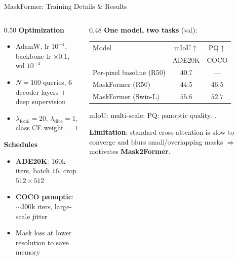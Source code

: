 \begin{frame}{MaskFormer: Training Details \& Results}

  \begin{columns}[t]
    \begin{column}{0.50\textwidth}
      \textbf{Optimization}
      \begin{itemize}
        \item AdamW, lr $10^{-4}$, backbone lr $\times 0.1$, wd $10^{-4}$
        \item $N = 100$ queries, $6$ decoder layers $+$ deep supervision
        \item $\lambda_\text{focal} = 20$, $\lambda_\text{dice} = 1$, class CE weight $= 1$
      \end{itemize}

      \vspace{0.3em}
      \textbf{Schedules}
      \begin{itemize}
        \item \textbf{ADE20K}: $160$k iters, batch $16$, crop $512{\times}512$
        \item \textbf{COCO panoptic}: $\sim$$300$k iters, large-scale jitter
        \item Mask loss at lower resolution to save memory
      \end{itemize}
    \end{column}
    \begin{column}{0.48\textwidth}
      \textbf{One model, two tasks} (val):
      \vspace{0.3em}
      \begin{center}
        {\footnotesize
        \begin{tabular}{lcc}
          \toprule
          Model & mIoU$\uparrow$ & PQ$\uparrow$ \\
                & {\tiny ADE20K} & {\tiny COCO} \\
          \midrule
          Per-pixel baseline (R50) & $40.7$ & --- \\
          MaskFormer (R50)         & $44.5$ & $46.5$ \\
          MaskFormer (Swin-L)      & $\mathbf{55.6}$ & $\mathbf{52.7}$ \\
          \bottomrule
        \end{tabular}}
      \end{center}
      \vspace{0.2em}
      {\scriptsize mIoU: multi-scale; PQ: panoptic quality. \textcite{cheng2021maskformer}.}

      \vspace{0.4em}
      \textbf{Limitation}: standard cross-attention is slow to converge and blurs small/overlapping masks $\Rightarrow$ motivates \textbf{Mask2Former}.
    \end{column}
  \end{columns}
\end{frame}

